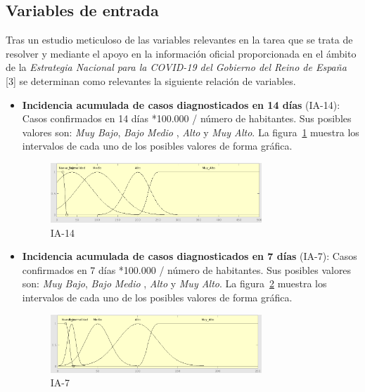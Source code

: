 \documentclass[12pt,a4paper, xcolor=table]{article}
\begin{document}
\subsection{Variables de entrada}
Tras un estudio meticuloso de las variables relevantes en la tarea que se trata de resolver y mediante el apoyo en la información oficial proporcionada en el ámbito de la \textit{Estrategia Nacional para la COVID-19 del Gobierno del Reino de España} [3] se determinan como relevantes la siguiente relación de variables.

\begin{itemize}

    \item \textbf{Incidencia acumulada de casos diagnosticados en 14 días} (IA-14): Casos confirmados en 14 días *100.000 / número de habitantes. Sus posibles valores son: \textit{Muy Bajo}, \textit{Bajo} \textit{Medio }, {\textit{Alto}} y {\textit{Muy Alto}}. La figura~\ref{IA-14} muestra los intervalos de cada uno de los posibles valores de forma gráfica.

    \begin{figure}[!h]
      \centering
      \includegraphics[width=300px]{img/ia_ac_14.png}
      \caption{IA-14}
      \label{IA-14}
    \end{figure}

    \item \textbf{Incidencia acumulada de casos diagnosticados en 7 días} (IA-7): Casos confirmados en 7 días *100.000 / número de habitantes. Sus posibles valores son: \textit{Muy Bajo}, \textit{Bajo} \textit{Medio }, {\textit{Alto}} y {\textit{Muy Alto}}. La figura~\ref{IA-7} muestra los intervalos de cada uno de los posibles valores de forma gráfica.
    
    \begin{figure}[!h]
      \centering
      \includegraphics[width=300px]{img/ia_ac_7.png}
      \caption{IA-7}
      \label{IA-7}
    \end{figure}


\end{itemize}
\end{document}
